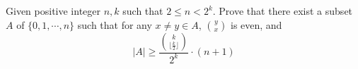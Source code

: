 Given positive integer $n,k$ such that $2 \le n <2^k$. Prove that there exist a subset $A$ of $\{0,1,\cdots,n\}$ such that for any $x \neq y \in A$, ${y\choose x}$ is even, and $$|A| \ge \frac{{k\choose \lfloor \frac{k}{2} \rfloor}}{2^k} \cdot (n+1)$$
